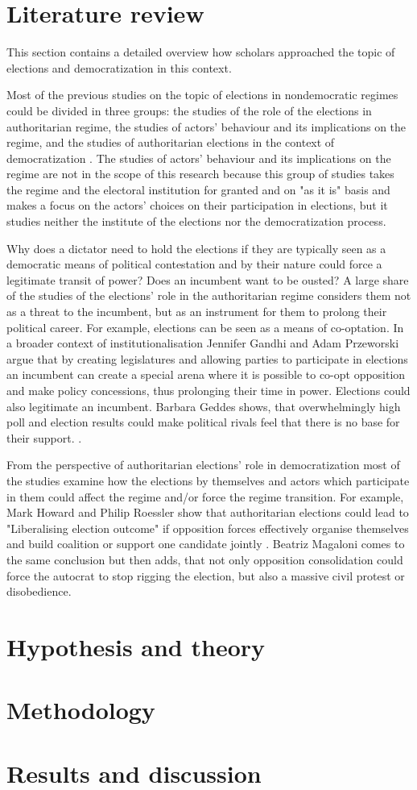 \documentclass[a4paper, 12pt]{article}
\begin{document}
\section*{Literature review}
This section contains a detailed overview how scholars approached the topic of elections and democratization in this context. \par
Most of the previous studies on the topic of elections in nondemocratic regimes could be divided in three groups: the studies of the role of the elections in authoritarian regime, the studies of actors' behaviour and its implications on the regime, and the studies of authoritarian elections in the context of democratization \parencite{gandhi_elections_2009}. The studies of actors' behaviour and its implications on the regime are not in the scope of this research because this group of studies takes the regime and the electoral institution for granted and on "as it is" basis and makes a focus on the actors' choices on their participation in elections, but it studies neither the institute of the elections nor the democratization process. \par
Why does a dictator need to hold the elections if they are typically seen as a democratic means of political contestation and by their nature could force a legitimate transit of power? Does an incumbent want to be ousted? A large share of the studies of the elections' role in the authoritarian regime considers them not as a threat to the incumbent, but as an instrument for them to prolong their political career. For example, elections can be seen as a means of co-optation. In a broader context of institutionalisation Jennifer Gandhi and Adam Przeworski argue that by creating legislatures and allowing parties to participate in elections an incumbent can create a special arena where it is possible to co-opt opposition and make policy concessions, thus prolonging their time in power. Elections could also legitimate an incumbent. Barbara Geddes shows, that overwhelmingly high poll and election results could make political rivals feel that there is no base for their support. \parencite{geddes_role_2005}. \par %
From the perspective of authoritarian elections' role in democratization most of the studies examine how the elections by themselves and actors which participate in them could affect the regime and/or force the regime transition. For example, Mark Howard and Philip Roessler show that authoritarian elections could lead to "Liberalising election outcome" if opposition forces effectively organise themselves and build coalition or support one candidate jointly \parencite{howard_liberalizing_2006}. Beatriz Magaloni comes to the same conclusion but then adds, that not only opposition consolidation could force the autocrat to stop rigging the election, but also a massive civil protest or disobedience. 

\section*{Hypothesis and theory}
\section*{Methodology}
\section*{Results and discussion}

\printbibliography
\end{document}
